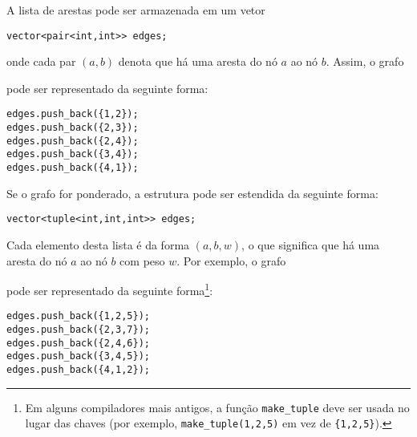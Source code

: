 A lista de arestas pode ser armazenada em um vetor
\begin{lstlisting}
vector<pair<int,int>> edges;
\end{lstlisting}
onde cada par $(a,b)$ denota que há uma aresta do nó $a$ ao nó $b$. Assim, o grafo

\begin{center}
\end{center}
pode ser representado da seguinte forma:
\begin{lstlisting}
edges.push_back({1,2});
edges.push_back({2,3});
edges.push_back({2,4});
edges.push_back({3,4});
edges.push_back({4,1});
\end{lstlisting}

\noindent
Se o grafo for ponderado, a estrutura pode ser estendida da seguinte forma:
\begin{lstlisting}
vector<tuple<int,int,int>> edges;
\end{lstlisting}
Cada elemento desta lista é da forma $(a,b,w)$, o que significa que há uma aresta do nó $a$ ao nó $b$ com peso $w$. Por exemplo, o grafo

\begin{center}
\end{center}
\begin{samepage}
pode ser representado da seguinte forma\footnote{Em alguns compiladores mais antigos, a função
\texttt{make\_tuple} deve ser usada no lugar das chaves (por exemplo,
\texttt{make\_tuple(1,2,5)} em vez de \texttt{\{1,2,5\}}).}:
\begin{lstlisting}
edges.push_back({1,2,5});
edges.push_back({2,3,7});
edges.push_back({2,4,6});
edges.push_back({3,4,5});
edges.push_back({4,1,2});
\end{lstlisting}
\end{samepage}
